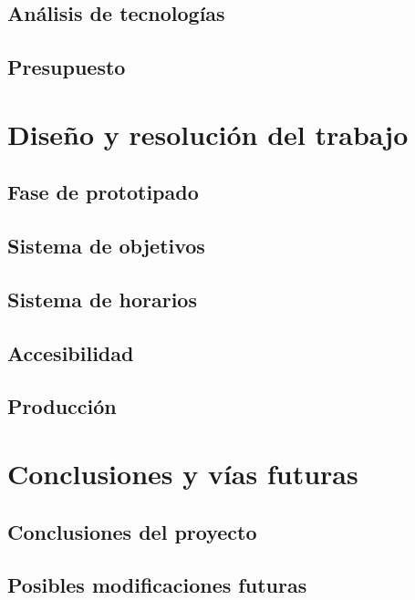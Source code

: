 \documentclass[10pt, a4paper]{aqademic}
\begin{document}
\section{Análisis de tecnologías}

\section{Presupuesto}


\chapter{Diseño y resolución del trabajo}

\section{Fase de prototipado}

\section{Sistema de objetivos}

\section{Sistema de horarios}

\section{Accesibilidad}

\section{Producción}


\chapter{Conclusiones y vías futuras}

\section{Conclusiones del proyecto}

\section{Posibles modificaciones futuras}

\newpage



\end{document}
